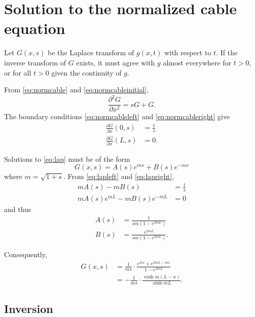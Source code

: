 \documentclass[parskip=half]{scrartcl}
\begin{document}
\section{Solution to the normalized cable equation}

Let $G(x, s)$ be the Laplace transform of $g(x, t)$ with respect to $t$.
If the inverse transform of $G$ exists, it must agree with $g$ almost everywhere
for $t>0$, or for all $t>0$ given the continuity of $g$.

From
\eqref{eq:normcable} and \eqref{eq:normcableinitial},
\begin{equation}
    \label{eq:lap}
    \frac{\partial^2 G}{\partial x^2} = sG + G.
\end{equation}
The boundary conditions \eqref{eq:normcableleft} and \eqref{eq:normcableright} give
\begin{align}
    \label{eq:lapleft}
    \frac{\partial G}{\partial x}(0, s) & = \frac{1}{s}
    \\
    \label{eq:lapright}
    \frac{\partial G}{\partial x}(L, s) & = 0.
\end{align}

Solutions to \eqref{eq:lap} must be of the form
\begin{equation}
    G(x, s) = A(s) e^{mx} +B(s) e^{-mx}
\end{equation}
where $m=\sqrt{1+s}$. From \eqref{eq:lapleft} and \eqref{eq:lapright},
\begin{align*}
    mA(s) - mB(s) & = \frac{1}{s}
    \\
    mA(s)e^{mL} -mB(s)e^{-mL} & = 0
\end{align*}
and thus
\begin{align*}
    A(s) & = \frac{1}{sm (1-e^{2mL})}
    \\
    B(s) & = \frac{e^{2mL}}{sm (1-e^{2mL})}.
\end{align*}

Consequently,
\begin{equation}
    \begin{aligned}
        G(x, s) &= \frac{1}{ms}\cdot\frac{e^{mx}+e^{2mL-mx}}{1-e^{2mL}}\\
                &= - \frac{1}{ms}\cdot\frac{\cosh m(L-x)}{\sinh mL}.
    \end{aligned}
\end{equation}

\subsection*{Inversion}
\end{document}
